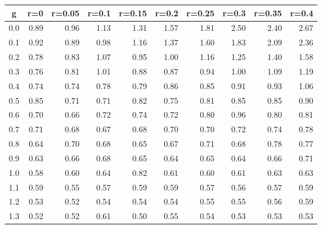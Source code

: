 %
\begin{table}[!tbp]
 \begin{center}
 \begin{tabular}{rrrrrrrrrr}\hline\hline
\multicolumn{1}{c}{g}&\multicolumn{1}{c}{r=0}&\multicolumn{1}{c}{r=0.05}&\multicolumn{1}{c}{r=0.1}&\multicolumn{1}{c}{r=0.15}&\multicolumn{1}{c}{r=0.2}&\multicolumn{1}{c}{r=0.25}&\multicolumn{1}{c}{r=0.3}&\multicolumn{1}{c}{r=0.35}&\multicolumn{1}{c}{r=0.4}\tabularnewline
\hline
0.0&0.89&0.96&1.13&1.31&1.57&1.81&2.50&2.40&2.67\tabularnewline
0.1&0.92&0.89&0.98&1.16&1.37&1.60&1.83&2.09&2.36\tabularnewline
0.2&0.78&0.83&1.07&0.95&1.00&1.16&1.25&1.40&1.58\tabularnewline
0.3&0.76&0.81&1.01&0.88&0.87&0.94&1.00&1.09&1.19\tabularnewline
0.4&0.74&0.74&0.78&0.79&0.86&0.85&0.91&0.93&1.06\tabularnewline
0.5&0.85&0.71&0.71&0.82&0.75&0.81&0.85&0.85&0.90\tabularnewline
0.6&0.70&0.66&0.72&0.74&0.72&0.80&0.96&0.80&0.81\tabularnewline
0.7&0.71&0.68&0.67&0.68&0.70&0.70&0.72&0.74&0.78\tabularnewline
0.8&0.64&0.70&0.68&0.65&0.67&0.71&0.68&0.78&0.77\tabularnewline
0.9&0.63&0.66&0.68&0.65&0.64&0.65&0.64&0.66&0.71\tabularnewline
1.0&0.58&0.60&0.64&0.82&0.61&0.60&0.61&0.63&0.63\tabularnewline
1.1&0.59&0.55&0.57&0.59&0.59&0.57&0.56&0.57&0.59\tabularnewline
1.2&0.53&0.52&0.54&0.54&0.54&0.55&0.55&0.56&0.59\tabularnewline
1.3&0.52&0.52&0.61&0.50&0.55&0.54&0.53&0.53&0.53\tabularnewline
\hline
\end{tabular}

\end{center}

\end{table}

